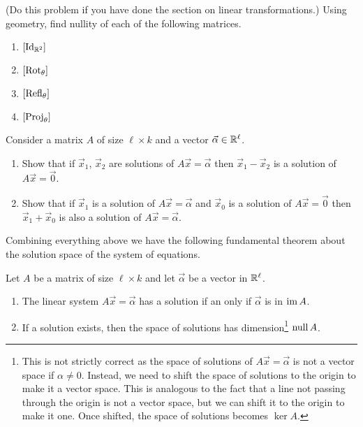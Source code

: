 \begin{qbox}(Do this problem if you have done the section on linear transformations.)
  \label{q:nullityComputation2}
  Using geometry, find nullity of each of the following matrices.
  \begin{multicols}{2}
    \begin{enumerate}
      \item $[\operatorname{Id}_{\mathbb{R}^2}]$
      \item $[\mathrm{Rot}_{\theta}]$
      \item $[\mathrm{Refl}_{\theta}]$
      \item $[\mathrm{Proj}_{\theta}]$
    \end{enumerate}
  \end{multicols}
\end{qbox}

\begin{qbox}
  Consider a matrix $A$ of size $\ell \times k$ and a vector $\vec{\alpha} \in \mathbb{R}^\ell$.
  \begin{enumerate}
    \item Show that if $\vec{x}_1$, $\vec{x}_2$ are solutions of $A \vec{x} = \vec{\alpha}$ then $\vec{x}_1 - \vec{x}_2$ is a solution of $A \vec{x} = \vec{0}$.
    \item Show that if $\vec{x}_1$ is a solution of $A \vec{x} = \vec{\alpha}$ and $\vec{x}_0$ is a solution of $A \vec{x} = \vec{0}$ then $\vec{x}_1 + \vec{x}_0$ is also a solution of $A \vec{x} = \vec{\alpha}$.
  \end{enumerate}
\end{qbox}


Combining everything above we have the following fundamental theorem about the solution space of the system of equations.
\begin{theorem}
  \label{theorem:dimensionSolutionSpace}
  Let $A$ be a matrix of size $\ell \times k$ and let $\vec{\alpha}$ be a vector in $\mathbb{R}^\ell$.
  \begin{enumerate}
    \item The linear system $A \vec{x} = \vec{\alpha}$ has a solution if an only if $\vec{\alpha}$ is in $\operatorname{im} A$.
    \item If a solution exists, then the space of solutions has dimension\footnote{This is not strictly correct as the space of solutions of $A \vec{x} = \vec{\alpha}$ is not a vector space if $\alpha \neq 0$. Instead, we need to shift the space of solutions to the origin to make it a vector space. This is analogous to the fact that a line not passing through the origin is not a vector space, but we can shift it to the origin to make it one. Once shifted, the space of solutions becomes $\ker A$.} $\operatorname{null} A$.
  \end{enumerate}
\end{theorem}

